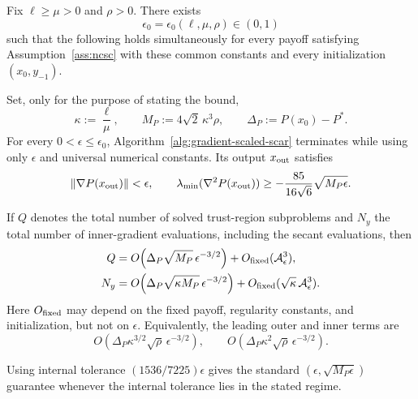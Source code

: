 \begin{theorem}
\label{thm:gradient-scaled-scar}
Fix $\ell\ge\mu>0$ and $\rho>0$.
There exists
\[
    \epsilon_0
    =
    \epsilon_0(\ell,\mu,\rho)
    \in(0,1)
\]
such that the following holds simultaneously for every payoff
satisfying Assumption~\ref{ass:ncsc} with these common constants and
every initialization $(x_0,y_{-1})$.

Set, only for the purpose of stating the bound,
\[
    \kappa:=\frac{\ell}{\mu},
    \qquad
    M_P:=4\sqrt2\,\kappa^3\rho,
    \qquad
    \Delta_P:=P(x_0)-P^*.
\]
For every $0<\epsilon\le\epsilon_0$,
Algorithm~\ref{alg:gradient-scaled-scar} terminates while using only
$\epsilon$ and universal numerical constants.
Its output $x_{\rm out}$ satisfies
\begin{equation}
    \|\nabla P(x_{\rm out})\|<\epsilon,
    \qquad
    \lambda_{\min}(\nabla^2P(x_{\rm out}))
    \ge
    -\frac{85}{16\sqrt6}
    \sqrt{M_P\epsilon}.
    \label{eq:gs-return}
\end{equation}

If $Q$ denotes the total number of solved trust-region subproblems
and $N_y$ the total number of inner-gradient evaluations, including
the secant evaluations, then
\begin{subequations}
\label{eq:gs-complexities}
\begin{align}
    Q
    &=
    O\!\left(
        \Delta_P\sqrt{M_P}\,
        \epsilon^{-3/2}
    \right)
    +
    O_{\rm fixed}
    (\mathcal A_\epsilon^3),
    \label{eq:gs-outer-complexity}
    \\
    N_y
    &=
    O\!\left(
        \Delta_P\sqrt{\kappa M_P}\,
        \epsilon^{-3/2}
    \right)
    +
    O_{\rm fixed}
    (
        \sqrt\kappa\,
        \mathcal A_\epsilon^3
    ).
    \label{eq:gs-inner-complexity}
\end{align}
\end{subequations}
Here $O_{\rm fixed}$ may depend on the fixed payoff,
regularity constants, and initialization, but not on $\epsilon$.
Equivalently, the leading outer and inner terms are
\begin{equation}
    O\!\left(
        \Delta_P\kappa^{3/2}\sqrt\rho\,
        \epsilon^{-3/2}
    \right),
    \qquad
    O\!\left(
        \Delta_P\kappa^2\sqrt\rho\,
        \epsilon^{-3/2}
    \right).
    \label{eq:gs-leading-complexities}
\end{equation}

Using internal tolerance $(1536/7225)\epsilon$ gives the standard
$(\epsilon,\sqrt{M_P\epsilon})$ guarantee whenever the internal
tolerance lies in the stated regime.
\end{theorem}

